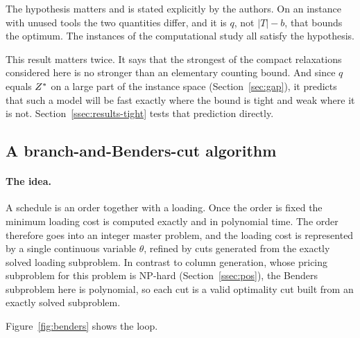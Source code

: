 The hypothesis matters and is stated explicitly by the authors. On an instance with
unused tools the two quantities differ, and it is $q$, not $\lvert T\rvert-b$, that
bounds the optimum. The instances of the computational study all satisfy the
hypothesis.

This result matters twice. It says that the strongest of the compact relaxations
considered here is no stronger than an elementary counting bound. And since $q$ equals $Z^{\ast}$ on a large
part of the instance space (Section~\ref{sec:gap}), it predicts that such a model will
be fast exactly where the bound is tight and weak where it is not.
Section~\ref{ssec:results-tight} tests that prediction directly.

\subsection{A branch-and-Benders-cut algorithm}\label{ssec:bbc}

\paragraph{The idea.}
A schedule is an order together with a loading. Once the order is fixed the minimum
loading cost is computed exactly and in polynomial time. The order therefore goes into
an integer master problem, and the loading cost is represented by a single continuous
variable $\theta$, refined by cuts generated from the exactly solved loading
subproblem. In contrast to column generation, whose pricing subproblem for this
problem is NP-hard (Section~\ref{ssec:pos}), the Benders subproblem here is
polynomial, so each cut is a valid optimality cut built from an exactly solved subproblem.

Figure~\ref{fig:benders} shows the loop.

